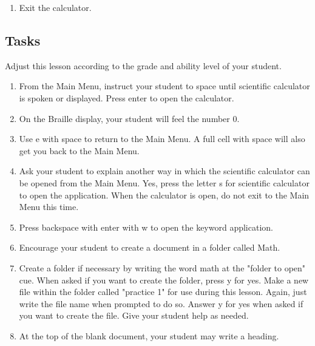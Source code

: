 \documentclass[10pt,letterpaper,twoside]{report}
\begin{document}
{{{{\begin{enumerate}
	\item Exit the calculator.
\end{enumerate}



 \subsection{Tasks}



Adjust this lesson according to the grade and ability level of your student.



\begin{enumerate}
	\item From the Main Menu, instruct your student to space until scientific calculator is spoken or displayed.  Press enter to open the calculator.
	      
	\item On the Braille display, your student will feel the number 0.
	      
	\item Use e with space to return to the Main Menu.  A full cell with space will also get you back to the Main Menu.
	      
	\item Ask your student to explain another way in which the scientific calculator can be opened from the Main Menu.  Yes, press the letter s for scientific calculator to open the application.  When the calculator is open, do not exit to the Main Menu this time.
	      
	\item Press backspace with enter with w to open the keyword application.
	      
	\item Encourage your student to create a document in a folder called Math.
	      
	\item Create a folder if necessary by writing the word math at the "folder to open" cue.  When asked if you want to create the folder, press y for yes.  Make a new file within the folder called "practice 1" for use during this lesson.  Again, just write the file name when prompted to do so.  Answer y for yes when asked if you want to create the file.  Give your student help as needed.
	      
	\item At the top of the blank document, your student may write a heading.
	      

\end{enumerate}}}}}
\end{document}
